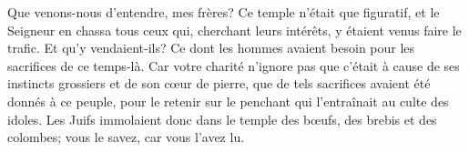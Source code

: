 Que venons-nous d’entendre, mes frères?
	Ce temple n’était que figuratif,
	et le Seigneur en chassa tous ceux qui, cherchant leurs intérêts,
	y étaient venus faire le trafic.
Et qu’y vendaient-ils?
	Ce dont les hommes avaient besoin pour les sacrifices de ce temps-là.
Car votre charité n’ignore pas
	que c’était à cause de ses instincts grossiers et de son cœur de pierre,
	que de tels sacrifices avaient été donnés à ce peuple,
	pour le retenir sur le penchant qui l’entraînait au culte des idoles.
Les Juifs immolaient donc dans le temple des bœufs, des brebis et des colombes;
	vous le savez, car vous l’avez lu.
